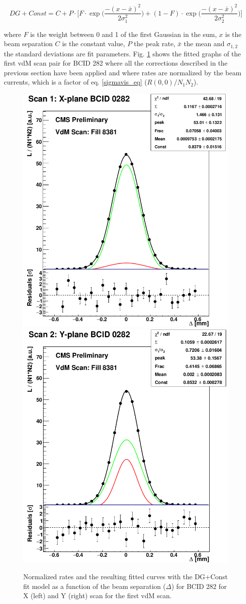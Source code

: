 \begin{equation}
DG+Const=
 C+P \cdot \Biggl[ F \cdot \exp \Biggl( \frac{-(x-\bar{x})^{2}}{2 \sigma_{1}^{2} } \Biggr) + (1-F) \cdot \exp \Biggl( \frac{-(x-\bar{x})^{2}}{2 \sigma_{2}^{2} } \Biggr) \Biggr] 
\end{equation}

where $F$ is the weight between 0 and 1 of the first Gaussian in the sum, $x$ is the beam separation $C$ is the constant value, $P$ the peak rate, $\bar{x}$ the mean and $\sigma_{1,2}$ the standard deviations are fit parameters. Fig. \ref{vdM1_282_XYscan} shows the fitted graphs of the first vdM scan pair for BCID 282 where  all the corrections described in the previous section have been applied and where  rates are normalized by the beam currents, which is a factor of eq. \ref{sigmavis_eq}  ($R(0,0)/N_{1}N_{2}$).

\begin{center}
\begin{figure}[h!]
\centering
\includegraphics[width=.37\textwidth]{Chapter4/xscan.png}
\includegraphics[width=.37\textwidth]{Chapter4/yscan.png}\\
\caption[vdM1 BCID 282]{Normalized rates and the resulting fitted curves with the DG+Const fit model as a function of the beam separation ($\Delta$) for BCID 282 for X (left) and Y (right) scan for the first vdM scan.}
\label{vdM1_282_XYscan}
\end{figure}
\end{center}

